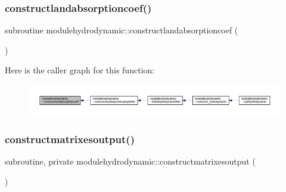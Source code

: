 \subsubsection{\texorpdfstring{constructlandabsorptioncoef()}{constructlandabsorptioncoef()}}
{\footnotesize\ttfamily subroutine modulehydrodynamic\+::constructlandabsorptioncoef (\begin{DoxyParamCaption}{ }\end{DoxyParamCaption})\hspace{0.3cm}{\ttfamily [private]}}

Here is the caller graph for this function\+:\nopagebreak
\begin{figure}[H]
\begin{center}
\leavevmode
\includegraphics[width=350pt]{namespacemodulehydrodynamic_a25b15c0ef46c1b48f735915c9ffdd9c2_icgraph}
\end{center}
\end{figure}
\mbox{\label{namespacemodulehydrodynamic_a40ae80918927a7eb25c954cec3bd2b40}} 
\subsubsection{\texorpdfstring{constructmatrixesoutput()}{constructmatrixesoutput()}}
{\footnotesize\ttfamily subroutine, private modulehydrodynamic\+::constructmatrixesoutput (\begin{DoxyParamCaption}{ }\end{DoxyParamCaption})\hspace{0.3cm}{\ttfamily [private]}}

